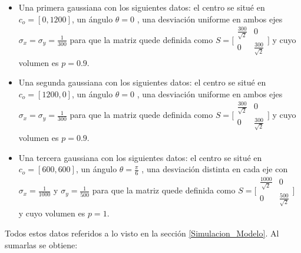 \begin{itemize}
	\item Una primera gaussiana con los siguientes datos: el centro se situé en $c_{o}=[0,1200]$, un ángulo $\theta=0$ , una desviación uniforme en ambos ejes $\sigma_{x}=\sigma_{y}=\frac{1}{300}$ para que la matriz quede definida como $S = \bigl[\begin{smallmatrix}\frac{300}{\sqrt{2}} & 0\\ 0 & \frac{300}{\sqrt{2}}\end{smallmatrix}\bigr]$  y cuyo volumen es $p = 0.9$. 
	\item Una segunda gaussiana con los siguientes datos: el centro se situé en $c_{o}=[1200,0]$, un ángulo $\theta=0$ , una desviación uniforme en ambos ejes $\sigma_{x}=\sigma_{y}=\frac{1}{300}$ para que la matriz quede definida como $S = \bigl[\begin{smallmatrix}\frac{300}{\sqrt{2}} & 0\\ 0 & \frac{300}{\sqrt{2}}\end{smallmatrix}\bigr]$  y cuyo volumen es $p = 0.9$.
	\item Una tercera gaussiana con los siguientes datos: el centro se situé en $c_{o}=[600,600]$, un ángulo $\theta=\frac{\pi}{6}$ , una desviación distinta en cada eje con $\sigma_{x}=\frac{1}{1000}$ y $\sigma_{y}=\frac{1}{500}$  para que la matriz quede definida como $S = \bigl[\begin{smallmatrix}\frac{1000}{\sqrt{2}} & 0\\ 0 & \frac{500}{\sqrt{2}}\end{smallmatrix}\bigr]$ y cuyo volumen es $p = 1$. 
\end{itemize}

Todos estos datos referidos a lo visto en la sección \ref{Simulacion_Modelo}. Al sumarlas se obtiene:

